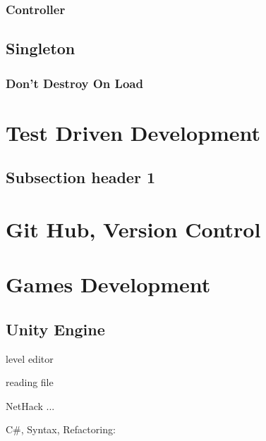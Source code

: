 \subsubsection{Controller}



\subsection{Singleton}

\subsubsection{Don't Destroy On Load}



\section{Test Driven Development}

\subsection{Subsection header 1}

\newpage

\newpage

\section{Git Hub, Version Control}

\section{Games Development}

\subsection{Unity Engine}

level editor

reading file

NetHack ...

\begin{description}
	
 \item[C\#, Syntax, Refactoring:]
 
\end{description}






